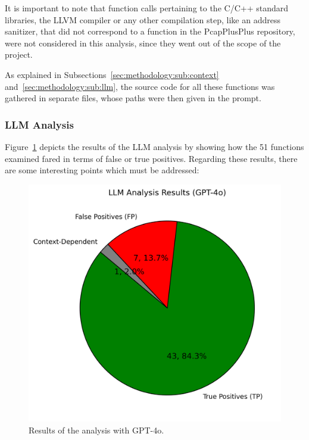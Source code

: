 It is important to note that function calls pertaining to the C/C++ standard libraries, the LLVM compiler or any other compilation step, like an address sanitizer, that did not correspond to a function in the PcapPlusPlus repository, were not considered in this analysis, since they went out of the scope of the project.

As explained in Subsections~\ref{sec:methodology:sub:context} and~\ref{sec:methodology:sub:llm}, the source code for all these functions was gathered in separate files, whose paths were then given in the prompt.

\subsubsection{LLM Analysis}
Figure~\ref{chart} depicts the results of the LLM analysis by showing how the 51 functions examined fared in terms of false or true positives.
Regarding these results, there are some interesting points which must be addressed:

\begin{figure}[ht]
    \centering
    \includegraphics[scale=0.7]{figures/llm_analysis_results_with_numbers.png} 
    \caption{Results of the analysis with GPT-4o.}
    \label{chart}
\end{figure}

